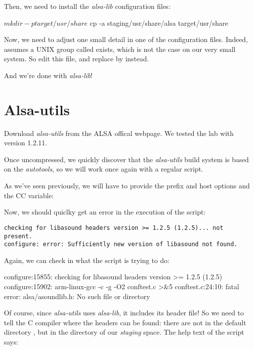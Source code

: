 Then, we need to install the {\em alsa-lib} configuration files:

\begin{bashinput}
$ mkdir -p target/usr/share
$ cp -a staging/usr/share/alsa target/usr/share
\end{bashinput}

Now, we need to adjust one small detail in one of the configuration
files. Indeed,  assumes a UNIX group
called  exists, which is not the case on our very small
system. So edit this file, and replace  by  instead.

And we're done with {\em alsa-lib}!

\section{Alsa-utils}

Download {\em alsa-utils} from the ALSA offical webpage. We tested the lab
with version 1.2.11.

Once uncompressed, we quickly discover that the {\em alsa-utils} build
system is based on the {\em autotools}, so we will work once again
with a regular  script.

As we've seen previously, we will have to provide the prefix and host
options and the CC variable:


Now, we should quiclky get an error in the execution of the
 script:

\begin{verbatim}
checking for libasound headers version >= 1.2.5 (1.2.5)... not present.
configure: error: Sufficiently new version of libasound not found.
\end{verbatim}

Again, we can check in  what the 
script is trying to do:

\begin{terminaloutput}
configure:15855: checking for libasound headers version >= 1.2.5 (1.2.5)
configure:15902: arm-linux-gcc -c -g -O2  conftest.c >&5
conftest.c:24:10: fatal error: alsa/asoundlib.h: No such file or directory
\end{terminaloutput}
\normalsize

Of course, since {\em alsa-utils} uses {\em alsa-lib}, it includes
its header file! So we need to tell the C compiler where the headers
can be found: there are not in the default directory
, but in the  directory of our
{\em staging} space. The help text of the  script says:

